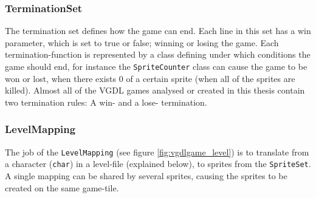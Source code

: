 \documentclass[a4paper,titlepage,final]{report}
\begin{document}
\subsubsection*{TerminationSet}
The termination set defines how the game can end. 
Each line in this set has a win parameter, which is set to true or false; winning or losing the game.
Each termination-function is represented by a class defining under which conditions the game should end, for instance the \texttt{SpriteCounter} class can cause the game to be won or lost, when there exists 0 of a certain sprite  (when all of the sprites are killed).
Almost all of the VGDL games analysed or created in this thesis contain two termination rules: A win- and a lose- termination.

\subsubsection*{LevelMapping}
The job of the \texttt{LevelMapping} (see figure \ref{fig:vgdlgame_level}) is to translate from a character (\texttt{char}) in a level-file (explained below), to sprites from the \texttt{SpriteSet}. 
A single mapping can be shared by several sprites, causing the sprites to be created on the same game-tile.
\end{document}
